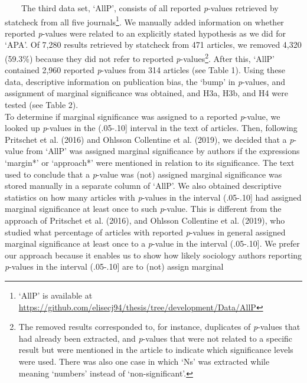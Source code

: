 \documentclass[
  12pt,
]{article}
\begin{document}
~~~~The third data set, `AllP', consists of all reported \emph{p}-values
retrieved by statcheck from all five journals\footnote{`AllP' is
  available at
  \url{https://github.com/elisecj94/thesis/tree/development/Data/AllP}}.
We manually added information on whether reported \emph{p}-values were
related to an explicitly stated hypothesis as we did for `APA'. Of 7,280
results retrieved by statcheck from 471 articles, we removed 4,320
(59.3\%) because they did not refer to reported
\emph{p}-values\footnote{The removed results corresponded to, for
  instance, duplicates of \emph{p}-values that had already been
  extracted, and \emph{p}-values that were not related to a specific
  result but were mentioned in the article to indicate which
  significance levels were used. There was also one case in which `Ns'
  was extracted while meaning `numbers' instead of `non-significant'.}.
After this, `AllP' contained 2,960 reported \emph{p}-values from 314
articles (see Table 1). Using these data, descriptive information on
publication bias, the `bump' in \emph{p}-values, and assignment of
marginal significance was obtained, and H3a, H3b, and H4 were tested
(see Table 2).\\
\hspace*{0.333em}\hspace*{0.333em}\hspace*{0.333em}\hspace*{0.333em}To
determine if marginal significance was assigned to a reported
\emph{p}-value, we looked up \emph{p}-values in the (.05-.10{]} interval
in the text of articles. Then, following Pritschet et al. (2016) and
Ohlsson Collentine et al. (2019), we decided that a \emph{p}-value from
`AllP' was assigned marginal significance by authors if the expressions
`margin*' or `approach*' were mentioned in relation to its significance.
The text used to conclude that a \emph{p}-value was (not) assigned
marginal significance was stored manually in a separate column of
`AllP'. We also obtained descriptive statistics on how many articles
with \emph{p}-values in the interval (.05-.10{]} had assigned marginal
significance at least once to such \emph{p}-value. This is different
from the approach of Pritschet et al. (2016), and Ohlsson Collentine et
al. (2019), who studied what percentage of articles with reported
\emph{p}-values in general assigned marginal significance at least once
to a \emph{p}-value in the interval (.05-.10{]}. We prefer our approach
because it enables us to show how likely sociology authors reporting
\emph{p}-values in the interval (.05-.10{]} are to (not) assign marginal
\end{document}

